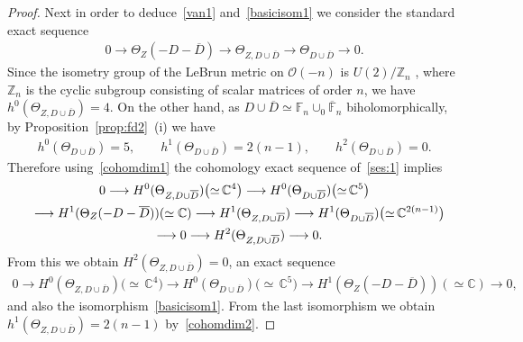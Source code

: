 \documentclass[11pt]{article}
\numberwithin{equation}{section}
\begin{document}
\begin{proof}
Next in order to deduce~\eqref{van1} and~\eqref{basicisom1} we consider the standard exact sequence
\begin{gather}
\label{ses:1}
0
\longrightarrow
\Theta_Z(-D-\overline D)
\longrightarrow
\Theta_{Z, D\cup\overline D}
\longrightarrow
\Theta_{D\cup \overline D}
\longrightarrow
0.
\end{gather}
Since the isometry group of the LeBrun metric on $\mathscr O(-n)$ is $U(2)/\mathbb{Z}_n$ \cite{LB88}, where
$\mathbb{Z}_n$ is the cyclic subgroup consisting of scalar matrices of order $n$, we have $ h^0 ( \Theta_{Z,
D\cup\overline D}) = 4.
$ On the other hand, as $D\cup \overline D\simeq \mathbb{F}_n\cup_0\overline{\mathbb{F}}_n$ biholomorphically, by
Proposition~\ref{prop:fd2}~(i) we have
\begin{gather}
\label{cohomdim2}
h^0 ( \Theta_{D\cup\overline D}) = 5,
\qquad
h^1 ( \Theta_{D\cup\overline D}) = 2(n-1),
\qquad
h^2 ( \Theta_{D\cup\overline D}) = 0.
\end{gather}
Therefore using~\eqref{cohomdim1} the cohomology exact sequence of~\eqref{ses:1} implies
\begin{gather}
\label{les:1}
0
\longrightarrow
H^0(\Theta_{Z, D\cup\overline D})
\big({\simeq}\,\mathbb{C}^4\big)
\longrightarrow
H^0(\Theta_{D\cup \overline D})
\big({\simeq}\, \mathbb{C}^5\big)
\nonumber
\\
\hphantom{0}{}
\longrightarrow
H^1(\Theta_Z(-D-\overline D))
(\simeq \mathbb{C})
\longrightarrow
H^1(\Theta_{Z, D\cup\overline D})
\longrightarrow
H^1(\Theta_{D\cup \overline D})
\big({\simeq}\, \mathbb{C}^{2(n-1)}\big)
\nonumber
\\
\hphantom{0}{}
\longrightarrow
0
\longrightarrow
H^2(\Theta_{Z, D\cup\overline D})
\longrightarrow
0.
\end{gather}
From this we obtain $H^2( \Theta_{Z, D\cup\overline D}) = 0$, an exact sequence
\begin{gather}
\label{LB:key}
0
\longrightarrow
H^0(\Theta_{Z,D\cup\overline D})
\big({\simeq}\, \mathbb{C}^4\big)
\longrightarrow
H^0(\Theta_{D\cup \overline D})
\big({\simeq}\, \mathbb{C}^5\big)
\longrightarrow
H^1( \Theta_Z(-D-\overline D))
(\simeq \mathbb{C})
\longrightarrow
0,\!\!\!\!
\end{gather}
and also the isomorphism~\eqref{basicisom1}.
From the last isomorphism we obtain $h^1(\Theta_{Z,D\cup\overline D}) = 2(n-1)$ by~\eqref{cohomdim2}.


\end{proof}
\end{document}
